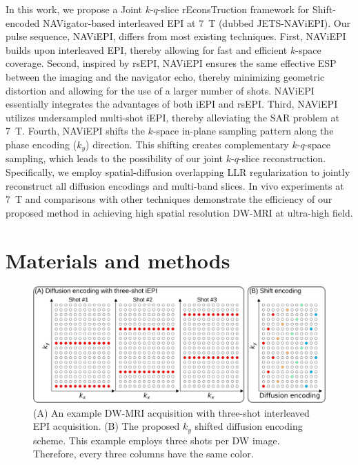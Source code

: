 \documentclass[preprint,12pt,authoryear,review]{elsarticle}
\begin{document}
    In this work, we propose a Joint $k$-$q$-slice rEconsTruction framework
    for Shift-encoded NAVigator-based interleaved EPI
    at \SI{7}{\tesla} (dubbed JETS-NAViEPI).
    Our pulse sequence, NAViEPI, differs from most existing techniques.
    First, NAViEPI builds upon interleaved EPI, thereby allowing for
    fast and efficient $k$-space coverage.
    Second, inspired by rsEPI, NAViEPI ensures the same effective ESP
    between the imaging and the navigator echo,
    thereby minimizing geometric distortion and
    allowing for the use of a larger number of shots.
    NAViEPI essentially integrates the advantages of both iEPI and rsEPI.
    Third, NAViEPI utilizes undersampled multi-shot iEPI,
    thereby alleviating the SAR problem at \SI{7}{\tesla}.
    Fourth, NAViEPI shifts the $k$-space in-plane sampling pattern
    along the phase encoding ($k_y$) direction.
    This shifting creates complementary $k$-$q$-space sampling,
    which leads to the possibility of
    our joint $k$-$q$-slice reconstruction.
    Specifically, we employ spatial-diffusion overlapping LLR regularization
    to jointly reconstruct all diffusion encodings and multi-band slices.
    In vivo experiments at \SI{7}{\tesla} and
    comparisons with other techniques
    demonstrate the efficiency of our proposed method in
    achieving high spatial resolution DW-MRI at ultra-high field.

    \clearpage

    \section{Materials and methods}
    \label{SEC:Meth}

    \begin{figure}
        \centering
        \includegraphics[width=\linewidth]{../figures/fig1.png}
        \caption{(A) An example DW-MRI acquisition
        with three-shot interleaved EPI acquisition.
        (B) The proposed $k_y$ shifted diffusion encoding scheme.
        This example employs three shots per DW image.
        Therefore, every three columns have the same color.}
        \label{FIG:sampling}
    \end{figure}
\end{document}
